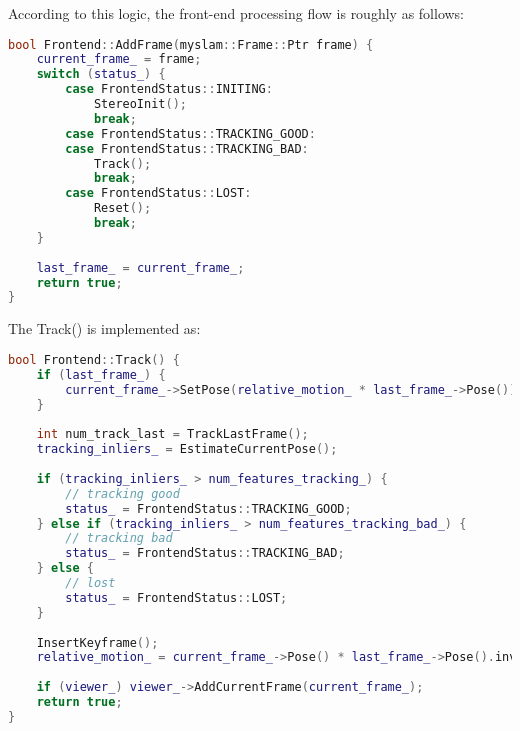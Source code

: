 According to this logic, the front-end processing flow is roughly as follows:
\begin{lstlisting}[language=c++,caption=slambook2/ch13/src/frontend.cpp]
bool Frontend::AddFrame(myslam::Frame::Ptr frame) {
	current_frame_ = frame;
	switch (status_) {
		case FrontendStatus::INITING:
			StereoInit();
			break;
		case FrontendStatus::TRACKING_GOOD:
		case FrontendStatus::TRACKING_BAD:
			Track();
			break;
		case FrontendStatus::LOST:
			Reset();
			break;
	}
	
	last_frame_ = current_frame_;
	return true;
}
\end{lstlisting}

The Track() is implemented as:
\begin{lstlisting}[language=c++,caption=slambook2/ch13/src/frontend.cpp]
bool Frontend::Track() {
	if (last_frame_) {
		current_frame_->SetPose(relative_motion_ * last_frame_->Pose());
	}
	
	int num_track_last = TrackLastFrame();
	tracking_inliers_ = EstimateCurrentPose();
	
	if (tracking_inliers_ > num_features_tracking_) {
		// tracking good
		status_ = FrontendStatus::TRACKING_GOOD;
	} else if (tracking_inliers_ > num_features_tracking_bad_) {
		// tracking bad
		status_ = FrontendStatus::TRACKING_BAD;
	} else {
		// lost
		status_ = FrontendStatus::LOST;
	}
	
	InsertKeyframe();
	relative_motion_ = current_frame_->Pose() * last_frame_->Pose().inverse();
	
	if (viewer_) viewer_->AddCurrentFrame(current_frame_);
	return true;
}
\end{lstlisting}

